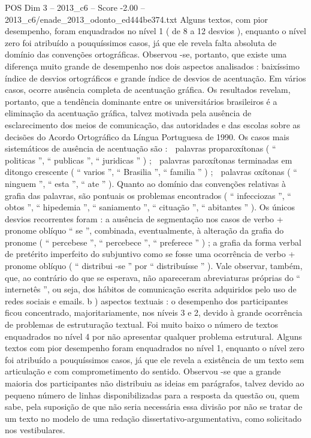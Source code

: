 \begin{textsample}{POS Dim 3 – 2013\_c6 – Score -2.00 – 2013\_c6/enade\_2013\_odonto\_ed444be374.txt}
Alguns textos, com pior desempenho, foram enquadrados no nível 1 ( de 8 a 12 desvios ), enquanto o nível zero foi atribuído a pouquíssimos casos, já que ele revela falta absoluta de domínio das convenções ortográficas.
Observou -se, portanto, que existe uma diferença muito grande de desempenho nos dois aspectos analisados : baixíssimo índice de desvios ortográficos e grande índice de desvios de acentuação.
Em vários casos, ocorre ausência completa de acentuação gráfica.
Os resultados revelam, portanto, que a tendência dominante entre os universitários brasileiros é a eliminação da acentuação gráfica, talvez motivada pela ausência de esclarecimento dos meios de comunicação, das autoridades e das escolas sobre as decisões do Acordo Ortográfico da Língua Portuguesa de 1990.
Os casos mais sistemáticos de ausência de acentuação são :  palavras proparoxítonas ( “ politicas ”, “ publicas ”, “ juridicas ” ) ;  palavras paroxítonas terminadas em ditongo crescente ( “ varios ”, “ Brasilia ”, “ familia ” ) ;  palavras oxítonas ( “ ninguem ”, “ esta ”, “ ate ” ).
Quanto ao domínio das convenções relativas à grafia das palavras, são pontuais os problemas encontrados ( “ infecciozas ”, “ obtos ”, “ hipedemia ”, “ saniamento ”, “ cituação ”, “ abitantes ” ).
Os únicos desvios recorrentes foram : a ausência de segmentação nos casos de verbo + pronome oblíquo “ se ”, combinada, eventualmente, à alteração da grafia do pronome ( “ percebese ”, “ percebece ”, “ preferece ” ) ; a grafia da forma verbal de pretérito imperfeito do subjuntivo como se fosse uma ocorrência de verbo + pronome oblíquo ( “ distribui -se ” por “ distribuísse ” ).
Vale observar, também, que, ao contrário do que se esperava, não apareceram abreviaturas próprias do “ internetês ”, ou seja, dos hábitos de comunicação escrita adquiridos pelo uso de redes sociais e emails. b ) aspectos textuais : o desempenho dos participantes ficou concentrado, majoritariamente, nos níveis 3 e 2, devido à grande ocorrência de problemas de estruturação textual.
Foi muito baixo o número de textos enquadrados no nível 4 por não apresentar qualquer problema estrutural.
Alguns textos com pior desempenho foram enquadrados no nível 1, enquanto o nível zero foi atribuído a pouquíssimos casos, já que ele revela a existência de um texto sem articulação e com comprometimento do sentido.
Observou -se que a grande maioria dos participantes não distribuiu as ideias em parágrafos, talvez devido ao pequeno número de linhas disponibilizadas para a resposta da questão ou, quem sabe, pela suposição de que não seria necessária essa divisão por não se tratar de um texto no modelo de uma redação dissertativo-argumentativa, como solicitado nos vestibulares.

\end{textsample}

